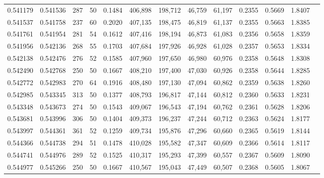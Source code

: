 \begin{tabular}{rrrrrrrrrrrrr}
0.541179 & 0.541536 &   287 &  50 &                                     0.1484 & 406,898 & 198,712 &  46,759 &  61,197 & 0.2355 & 0.5669 & 1.8407 \\
0.541537 & 0.541758 &   237 &  60 &                                     0.2020 & 407,135 & 198,475 &  46,819 &  61,137 & 0.2355 & 0.5663 & 1.8385 \\
0.541761 & 0.541954 &   281 &  54 &                                     0.1612 & 407,416 & 198,194 &  46,873 &  61,083 & 0.2356 & 0.5658 & 1.8359 \\
0.541956 & 0.542136 &   268 &  55 &                                     0.1703 & 407,684 & 197,926 &  46,928 &  61,028 & 0.2357 & 0.5653 & 1.8334 \\
0.542138 & 0.542476 &   276 &  52 &                                     0.1585 & 407,960 & 197,650 &  46,980 &  60,976 & 0.2358 & 0.5648 & 1.8308 \\
0.542490 & 0.542768 &   250 &  50 &                                     0.1667 & 408,210 & 197,400 &  47,030 &  60,926 & 0.2358 & 0.5644 & 1.8285 \\
0.542772 & 0.542983 &   270 &  64 &                                     0.1916 & 408,480 & 197,130 &  47,094 &  60,862 & 0.2359 & 0.5638 & 1.8260 \\
0.542985 & 0.543345 &   313 &  50 &                                     0.1377 & 408,793 & 196,817 &  47,144 &  60,812 & 0.2360 & 0.5633 & 1.8231 \\
0.543348 & 0.543673 &   274 &  50 &                                     0.1543 & 409,067 & 196,543 &  47,194 &  60,762 & 0.2361 & 0.5628 & 1.8206 \\
0.543681 & 0.543996 &   306 &  50 &                                     0.1404 & 409,373 & 196,237 &  47,244 &  60,712 & 0.2363 & 0.5624 & 1.8177 \\
0.543997 & 0.544361 &   361 &  52 &                                     0.1259 & 409,734 & 195,876 &  47,296 &  60,660 & 0.2365 & 0.5619 & 1.8144 \\
0.544366 & 0.544738 &   294 &  51 &                                     0.1478 & 410,028 & 195,582 &  47,347 &  60,609 & 0.2366 & 0.5614 & 1.8117 \\
0.544741 & 0.544976 &   289 &  52 &                                     0.1525 & 410,317 & 195,293 &  47,399 &  60,557 & 0.2367 & 0.5609 & 1.8090 \\
0.544977 & 0.545266 &   250 &  50 &                                     0.1667 & 410,567 & 195,043 &  47,449 &  60,507 & 0.2368 & 0.5605 & 1.8067 \\

\end{tabular}
